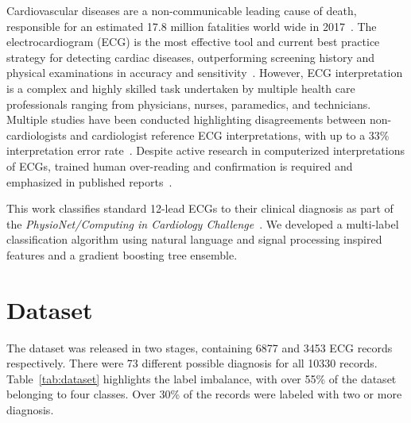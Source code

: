 \documentclass[twocolumn]{cinc}
\begin{document}
Cardiovascular diseases are a non-communicable leading cause of death, responsible for an estimated 17.8 million fatalities world wide in 2017~\cite{roth_global_2018}.
The electrocardiogram (ECG) is the most effective tool and current best practice strategy for detecting cardiac diseases, outperforming screening history and physical examinations in accuracy and sensitivity~\cite{harmon_effectiveness_2015}.
However, ECG interpretation is a complex and highly skilled task undertaken by multiple health care professionals ranging from physicians, nurses, paramedics, and technicians.
Multiple studies have been conducted highlighting disagreements between non-cardiologists and cardiologist reference ECG interpretations, with up to a 33\% interpretation error rate~\cite{mele_improving_2008}.
Despite active research in computerized interpretations of ECGs, trained human over-reading and confirmation is required and emphasized in published reports~\cite{schlapfer_computer-interpreted_2017}.

This work classifies standard 12-lead ECGs to their clinical diagnosis as part of the \emph{PhysioNet/Computing in Cardiology Challenge}~\cite{physionet_challenge_2020}.
We developed a multi-label classification algorithm using natural language and signal processing inspired features and a gradient boosting tree ensemble.

\section{Dataset}

The dataset was released in two stages, containing 6877 and 3453 ECG records respectively.
There were 73 different possible diagnosis for all 10330 records.
Table~\ref{tab:dataset} highlights the label imbalance, with over 55\% of the dataset belonging to four classes.
Over 30\% of the records were labeled with two or more diagnosis.
\end{document}
